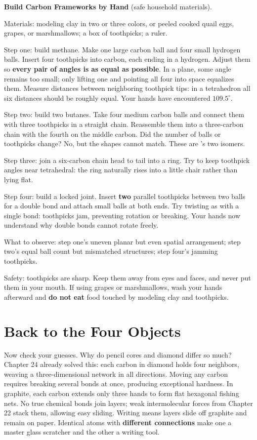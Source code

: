 \begin{shiyan}
\textbf{Build Carbon Frameworks by Hand} (safe household materials).

Materials: modeling clay in two or three colors, or peeled cooked quail eggs, grapes, or marshmallows; a box of toothpicks; a ruler.

Step one: build methane. Make one large carbon ball and four small hydrogen balls. Insert four toothpicks into carbon, each ending in a hydrogen. Adjust them so \textbf{every pair of angles is as equal as possible}. In a plane, some angle remains too small; only lifting one and pointing all four into space equalizes them. Measure distances between neighboring toothpick tips: in a tetrahedron all six distances should be roughly equal. Your hands have encountered $109.5^{\circ}$.

Step two: build two butanes. Take four medium carbon balls and connect them with three toothpicks in a straight chain. Reassemble them into a three-carbon chain with the fourth on the middle carbon. Did the number of balls or toothpicks change? No, but the shapes cannot match. These are 's two isomers.

Step three: join a six-carbon chain head to tail into a ring. Try to keep toothpick angles near tetrahedral: the ring naturally rises into a little chair rather than lying flat.

Step four: build a locked joint. Insert \textbf{two} parallel toothpicks between two balls for a double bond and attach small balls at both ends. Try twisting as with a single bond: toothpicks jam, preventing rotation or breaking. Your hands now understand why double bonds cannot rotate freely.

What to observe: step one's uneven planar but even spatial arrangement; step two's equal ball count but mismatched structures; step four's jamming toothpicks.

Safety: toothpicks are sharp. Keep them away from eyes and faces, and never put them in your mouth. If using grapes or marshmallows, wash your hands afterward and \textbf{do not eat} food touched by modeling clay and toothpicks.
\end{shiyan}

\section{Back to the Four Objects}

Now check your guesses. Why do pencil cores and diamond differ so much? Chapter 24 already solved this: each carbon in diamond holds four neighbors, weaving a three-dimensional network in all directions. Moving any carbon requires breaking several bonds at once, producing exceptional hardness. In graphite, each carbon extends only three hands to form flat hexagonal fishing nets. No true chemical bonds join layers; weak intermolecular forces from Chapter 22 stack them, allowing easy sliding. Writing means layers slide off graphite and remain on paper. Identical atoms with \textbf{different connections} make one a master glass scratcher and the other a writing tool.

